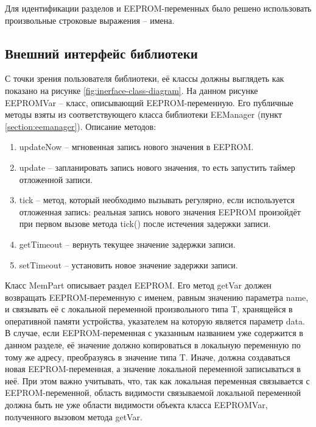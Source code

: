 Для идентификации разделов и EEPROM-переменных было решено использовать произвольные строковые выражения -- имена.



\subsection{Внешний интерфейс библиотеки}

С точки зрения пользователя библиотеки, её классы должны выглядеть как показано на рисунке \ref{fig:inerface-class-diagram}.
На данном рисунке EEPROMVar -- класс, описывающий EEPROM-переменную.
Его публичные методы взяты из соответствующего класса библиотеки EEManager (пункт \ref{section:eemanager}).
Описание методов:
\begin{enumerate}
	\item updateNow -- мгновенная запись нового значения в EEPROM.
	\item update -- запланировать запись нового значения, то есть запустить таймер отложенной записи.
	\item tick -- метод, который необходимо вызывать регулярно, если используется отложенная запись: реальная запись нового значения EEPROM произойдёт при первом вызове метода tick() после истечения задержки записи.
	\item getTimeout -- вернуть текущее значение задержки записи.
	\item setTimeout -- установить новое значение задержки записи.
\end{enumerate}

Класс MemPart описывает раздел EEPROM. 
Его метод getVar должен возвращать EEPROM-переменную с именем, равным значению параметра name, и связывать её с локальной переменной произвольного типа T, хранящейся в оперативной памяти устройства, указателем на которую является параметр data.
В случае, если EEPROM-переменная с указанным названием уже содержится в данном разделе, её значение должно копироваться в локальную переменную по тому же адресу, преобразуясь в значение типа T.
Иначе, должна создаваться новая EEPROM-переменная, а значение локальной переменной записываться в неё.
При этом важно учитывать, что, так как локальная переменная связывается с EEPROM-переменной, область видимости связываемой локальной переменной должна быть не уже области видимости объекта класса EEPROMVar, полученного вызовом метода getVar.

